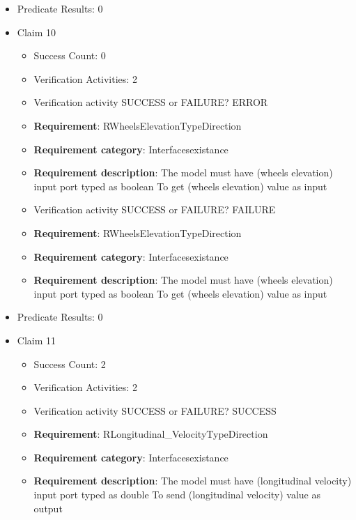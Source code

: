 \documentclass{article}
\begin{document}
\begin{itemize}
\begin{itemize}
				\end{itemize}
				
									    
				\item Predicate Results: 0

  				  \item Claim 10
				\begin{itemize}
			    	\item Success Count: 0 
			    	\item Verification Activities: 2
					\item Verification activity SUCCESS or FAILURE? ERROR
		
						\item \textbf{Requirement}: RWheelsElevationTypeDirection 
						\item \textbf{Requirement category}: Interfacesexistance 
						\item \textbf{Requirement description}: The model must have (wheels elevation) input port typed as boolean To get (wheels elevation) value as input
					
					\item Verification activity SUCCESS or FAILURE? FAILURE
		
						\item \textbf{Requirement}: RWheelsElevationTypeDirection 
						\item \textbf{Requirement category}: Interfacesexistance 
						\item \textbf{Requirement description}: The model must have (wheels elevation) input port typed as boolean To get (wheels elevation) value as input
					
				\end{itemize}
				
									    
				\item Predicate Results: 0

  				  \item Claim 11
				\begin{itemize}
			    	\item Success Count: 2 
			    	\item Verification Activities: 2
					\item Verification activity SUCCESS or FAILURE? SUCCESS
		
						\item \textbf{Requirement}: RLongitudinal\_VelocityTypeDirection 
						\item \textbf{Requirement category}: Interfacesexistance 
						\item \textbf{Requirement description}: The model must have (longitudinal velocity) input port typed as double To send (longitudinal velocity) value as output
					

\end{itemize}
\end{itemize}
\end{document}
